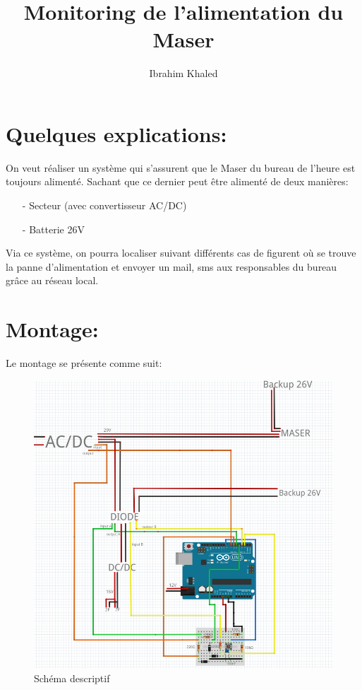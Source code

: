 \documentclass[12pt,a4paper]{article}
\title{Monitoring de l'alimentation du Maser}
\author{Ibrahim Khaled}
\date{}
\begin{document}
\maketitle
\section*{Quelques explications:}
On veut réaliser un système qui s'assurent que le Maser du bureau de l'heure est toujours alimenté. Sachant que ce dernier peut être alimenté de deux manières: 

\begin{itemize}
\item[-]Secteur (avec convertisseur AC/DC)
\item[-]Batterie 26V

\end{itemize}

\bigskip

Via ce système, on pourra localiser suivant différents cas de figurent où se trouve la panne d'alimentation et envoyer un mail, sms aux responsables du bureau grâce au réseau local. 

\section*{Montage:}  
Le montage se présente comme suit: 

\begin{figure}[!h]
\includegraphics[scale=0.7]{circuit_MASER3.PNG}
\caption{Schéma descriptif}
\end{figure}
\end{document}
